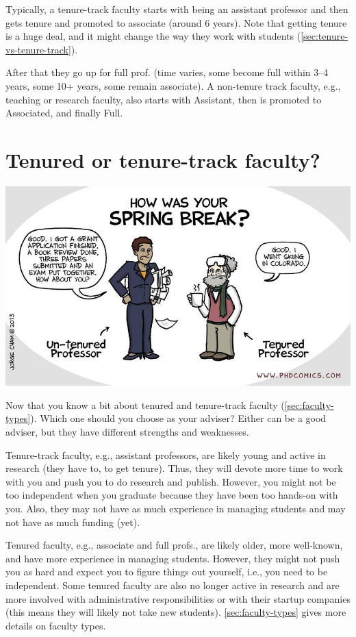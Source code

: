 \documentclass[oneside,11pt,dvipsnames]{book}
\begin{document}
Typically, a tenure-track faculty starts with being an assistant professor and then gets tenure and promoted to associate (around 6 years). Note that getting tenure is a huge deal, and it might change the way they work with students (\autoref{sec:tenure-vs-tenure-track}).

After that they go up for full prof. (time varies, some become full within 3--4 years, some 10+ years, some remain associate). A non-tenure track faculty, e.g., teaching or research faculty, also starts with Assistant, then is promoted to Associated, and finally Full.


\section{Tenured or tenure-track faculty?}\label{sec:tenure-vs-tenure-track}

\begin{center}
  \includegraphics[scale=0.4]{files/c8.png}
\end{center}

Now that you know a bit about tenured and tenure-track faculty (\autoref{sec:faculty-types}).  Which one should you choose as your adviser? 
Either can be a good adviser, but they have different strengths and weaknesses.


Tenure-track faculty, e.g., assistant professors, are likely young and active in research (they have to, to get tenure). Thus, they will devote more time to work with you and push you to do research and publish. However, you might not be too independent when you graduate because they have been too hands-on with you.  Also, they may not have as much experience in managing students and may not have as much funding (yet).

Tenured faculty, e.g., associate and full profs., are likely older, more well-known, and have more experience in managing students.  However, they might not push you as hard and expect you to figure things out yourself, i.e., you need to be independent.  Some tenured faculty are also no longer active in research and are more involved with administrative responsibilities or with their startup companies (this means they will likely not take new students). \autoref{sec:faculty-types} gives more details on faculty types.
\end{document}
